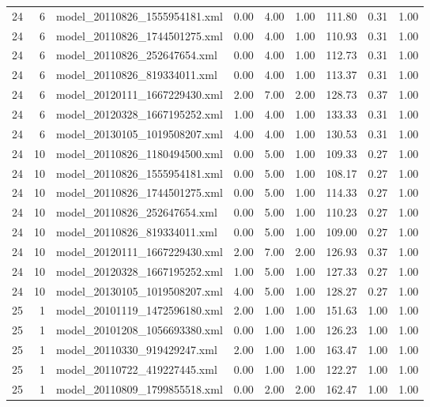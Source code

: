 \begin{table}[ht]
\begin{tabular}{rrlrrrrrr}
   24 &   6 & model\_20110826\_1555954181.xml & 0.00 & 4.00 & 1.00 & 111.80 & 0.31 & 1.00 \\ 
   24 &   6 & model\_20110826\_1744501275.xml & 0.00 & 4.00 & 1.00 & 110.93 & 0.31 & 1.00 \\ 
   24 &   6 & model\_20110826\_252647654.xml & 0.00 & 4.00 & 1.00 & 112.73 & 0.31 & 1.00 \\ 
   24 &   6 & model\_20110826\_819334011.xml & 0.00 & 4.00 & 1.00 & 113.37 & 0.31 & 1.00 \\ 
   24 &   6 & model\_20120111\_1667229430.xml & 2.00 & 7.00 & 2.00 & 128.73 & 0.37 & 1.00 \\ 
   24 &   6 & model\_20120328\_1667195252.xml & 1.00 & 4.00 & 1.00 & 133.33 & 0.31 & 1.00 \\ 
   24 &   6 & model\_20130105\_1019508207.xml & 4.00 & 4.00 & 1.00 & 130.53 & 0.31 & 1.00 \\ 
   24 &  10 & model\_20110826\_1180494500.xml & 0.00 & 5.00 & 1.00 & 109.33 & 0.27 & 1.00 \\ 
   24 &  10 & model\_20110826\_1555954181.xml & 0.00 & 5.00 & 1.00 & 108.17 & 0.27 & 1.00 \\ 
   24 &  10 & model\_20110826\_1744501275.xml & 0.00 & 5.00 & 1.00 & 114.33 & 0.27 & 1.00 \\ 
   24 &  10 & model\_20110826\_252647654.xml & 0.00 & 5.00 & 1.00 & 110.23 & 0.27 & 1.00 \\ 
   24 &  10 & model\_20110826\_819334011.xml & 0.00 & 5.00 & 1.00 & 109.00 & 0.27 & 1.00 \\ 
   24 &  10 & model\_20120111\_1667229430.xml & 2.00 & 7.00 & 2.00 & 126.93 & 0.37 & 1.00 \\ 
   24 &  10 & model\_20120328\_1667195252.xml & 1.00 & 5.00 & 1.00 & 127.33 & 0.27 & 1.00 \\ 
   24 &  10 & model\_20130105\_1019508207.xml & 4.00 & 5.00 & 1.00 & 128.27 & 0.27 & 1.00 \\ 
   25 &   1 & model\_20101119\_1472596180.xml & 2.00 & 1.00 & 1.00 & 151.63 & 1.00 & 1.00 \\ 
   25 &   1 & model\_20101208\_1056693380.xml & 0.00 & 1.00 & 1.00 & 126.23 & 1.00 & 1.00 \\ 
   25 &   1 & model\_20110330\_919429247.xml & 2.00 & 1.00 & 1.00 & 163.47 & 1.00 & 1.00 \\ 
   25 &   1 & model\_20110722\_419227445.xml & 0.00 & 1.00 & 1.00 & 122.27 & 1.00 & 1.00 \\ 
   25 &   1 & model\_20110809\_1799855518.xml & 0.00 & 2.00 & 2.00 & 162.47 & 1.00 & 1.00 \\ 

\end{tabular}
\end{table}

